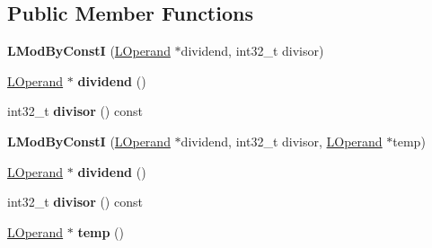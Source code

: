 \subsection*{Public Member Functions}
\begin{DoxyCompactItemize}
\item 
{\bfseries L\+Mod\+By\+ConstI} (\hyperlink{classv8_1_1internal_1_1_l_operand}{L\+Operand} $\ast$dividend, int32\+\_\+t divisor)\hypertarget{classv8_1_1internal_1_1_l_mod_by_const_i_a16e115d0d70a78dde77a10e073734347}{}\label{classv8_1_1internal_1_1_l_mod_by_const_i_a16e115d0d70a78dde77a10e073734347}

\item 
\hyperlink{classv8_1_1internal_1_1_l_operand}{L\+Operand} $\ast$ {\bfseries dividend} ()\hypertarget{classv8_1_1internal_1_1_l_mod_by_const_i_aeb9656f49d65a07307ea1a8d195f37f9}{}\label{classv8_1_1internal_1_1_l_mod_by_const_i_aeb9656f49d65a07307ea1a8d195f37f9}

\item 
int32\+\_\+t {\bfseries divisor} () const \hypertarget{classv8_1_1internal_1_1_l_mod_by_const_i_a3c44698a4d3f5b97d2d382e3d63510e3}{}\label{classv8_1_1internal_1_1_l_mod_by_const_i_a3c44698a4d3f5b97d2d382e3d63510e3}

\item 
{\bfseries L\+Mod\+By\+ConstI} (\hyperlink{classv8_1_1internal_1_1_l_operand}{L\+Operand} $\ast$dividend, int32\+\_\+t divisor, \hyperlink{classv8_1_1internal_1_1_l_operand}{L\+Operand} $\ast$temp)\hypertarget{classv8_1_1internal_1_1_l_mod_by_const_i_a3770c7bc4ff51c903e7eb511ddd7607d}{}\label{classv8_1_1internal_1_1_l_mod_by_const_i_a3770c7bc4ff51c903e7eb511ddd7607d}

\item 
\hyperlink{classv8_1_1internal_1_1_l_operand}{L\+Operand} $\ast$ {\bfseries dividend} ()\hypertarget{classv8_1_1internal_1_1_l_mod_by_const_i_aeb9656f49d65a07307ea1a8d195f37f9}{}\label{classv8_1_1internal_1_1_l_mod_by_const_i_aeb9656f49d65a07307ea1a8d195f37f9}

\item 
int32\+\_\+t {\bfseries divisor} () const \hypertarget{classv8_1_1internal_1_1_l_mod_by_const_i_a3c44698a4d3f5b97d2d382e3d63510e3}{}\label{classv8_1_1internal_1_1_l_mod_by_const_i_a3c44698a4d3f5b97d2d382e3d63510e3}

\item 
\hyperlink{classv8_1_1internal_1_1_l_operand}{L\+Operand} $\ast$ {\bfseries temp} ()\hypertarget{classv8_1_1internal_1_1_l_mod_by_const_i_afbf904b1f321f92247a5c3b37ef34430}{}\label{classv8_1_1internal_1_1_l_mod_by_const_i_afbf904b1f321f92247a5c3b37ef34430}


\end{DoxyCompactItemize}
